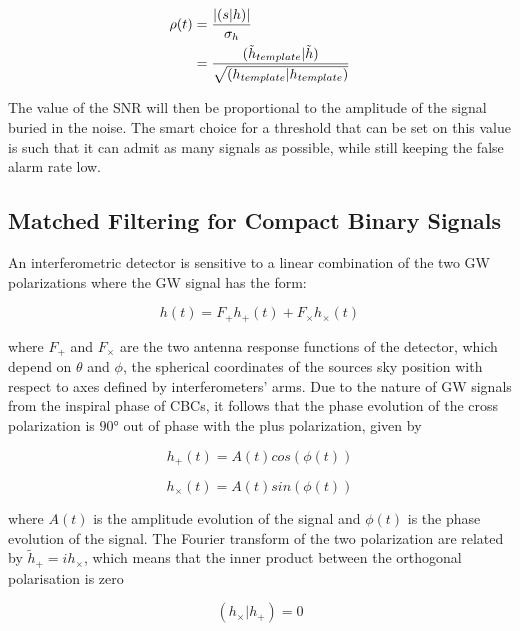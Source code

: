 \documentclass[binding=0.6cm, LaM]{sapthesis}
\begin{document}
                \begin{align}
                        \rho(t) &= {{| (s|h) |} \over {\sigma_{h}}} \\
                             &= {{(\tilde h_{template}|\tilde h)} \over {\sqrt{(h_{template}|h_{template})}}}
                \end{align}

        The value of the SNR will then be proportional to the amplitude of the signal buried in the noise.
	The smart choice for a threshold that can be set on this value is such that
	it can admit as many signals as possible, while still keeping the false alarm rate low. 

\subsection{Matched Filtering for Compact Binary Signals}

	An interferometric detector is sensitive to a linear combination 
	of the two GW polarizations where the GW signal has the form: 

                \begin{equation}
                h(t) = F_{+}h_{+} (t) + F_{\times}h_{\times}(t)
                \end{equation}

	where $F_{+}$ and $F_{\times}$ are the two antenna response functions of the detector, 
	which depend on $\theta$ and $\phi$, 
	the spherical coordinates of the sources sky position with respect to axes defined by interferometers’ arms. 
	Due to the nature of GW signals from the inspiral phase of CBCs, 
	it follows that the phase evolution of the cross polarization is $\ang{90}$ out of phase with the plus polarization, given by 

		\begin{equation}
			h_{+}(t) = A(t) cos (\phi (t))
		\end{equation}

		\begin{equation}
			h_{\times}(t) = A(t) sin (\phi (t))  
		\end{equation}
	
	where $A(t)$ is the amplitude evolution of the signal 
	and $\phi(t)$ is the phase evolution of the signal. 
	The Fourier transform of the two polarization are related by $\tilde h_{+} = ih_{\times}$, 
	which means that the inner product between the orthogonal polarisation is zero 

		\begin{equation}
			(h_{\times}|h_{+}) = 0
		\end{equation}
 
\end{document}
